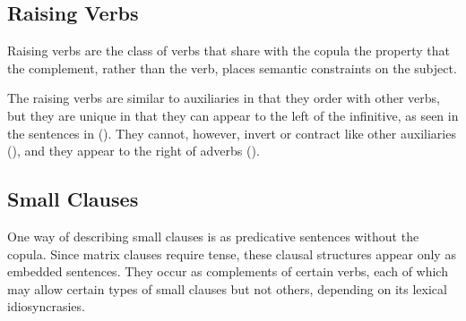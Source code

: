 \subsection{Raising Verbs}
\label{raising-verbs}

Raising verbs are the class of verbs that share with the copula the property
that the complement, rather than the verb, places semantic constraints on
the subject.  



The raising verbs are similar to auxiliaries in that they order with other
verbs, but they are unique in that they can appear to the left of the
infinitive, as seen in the sentences in ({}).  They cannot, however,
invert or contract like other auxiliaries ({}), and they appear to the
right of adverbs ({}).





\subsection{Small Clauses}

One way of describing small clauses is as predicative sentences without the
copula.  Since matrix clauses require tense, these clausal structures appear
only as embedded sentences.  They occur as complements of certain verbs, each
of which may allow certain types of small clauses but not others, depending on its
lexical idiosyncrasies.


